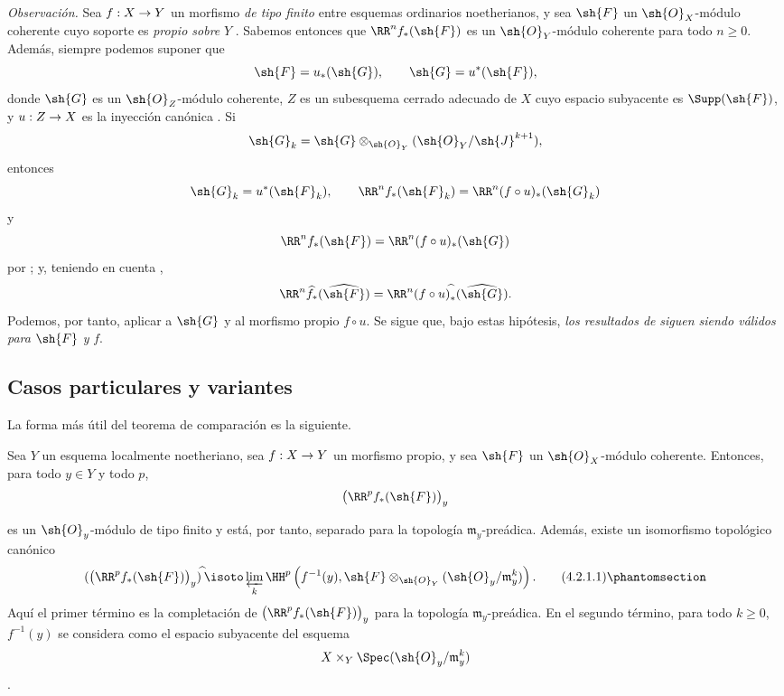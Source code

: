 \documentclass[oneside]{amsart}
\makeatletter
\renewcommand{\geq}{\geqslant}
\newcommand{\ega@arrow}[2]{\mathchoice{#1}{#2}{#2}{#2}}
\renewcommand{\to}{\ega@arrow{\longrightarrow}{\rightarrow}}
\newcommand{\oldpage}[2][]{{\marginnote{\normalfont\textbf{#1}~|~#2}}\ignorespaces}
\let\EGAOriginalLabel\label
\renewcommand{\label}[1]{\phantomsection\EGAOriginalLabel{#1}}
\makeatother
\begin{document}
\begin{env}[4.1.10]
\label{III.4.1.10}
\emph{Observación.}
Sea $f:X\to Y$ un morfismo \emph{de tipo finito} entre esquemas ordinarios
noetherianos, y sea $\sh{F}$ un $\sh{O}_X$-módulo coherente cuyo
soporte es \emph{propio sobre} $Y$ .
Sabemos entonces  que $\RR^n f_*(\sh{F})$ es un
$\sh{O}_Y$-módulo coherente para todo $n\geq0$.
Además, siempre podemos suponer que
\[
  \sh{F}=u_*(\sh{G}),
  \qquad
  \sh{G}=u^*(\sh{F}),
\]
donde $\sh{G}$ es un $\sh{O}_Z$-módulo coherente, $Z$ es un
subesquema cerrado adecuado de $X$ cuyo espacio subyacente es
$\Supp(\sh{F})$, y $u:Z\to X$ es la inyección canónica
.
Si
\[
  \sh{G}_k
  =
  \sh{G}\otimes_{\sh{O}_Y}
  (\sh{O}_Y/\sh{J}^{k+1}),
\]
entonces
\[
  \sh{G}_k=u^*(\sh{F}_k),
  \qquad
  \RR^n f_*(\sh{F}_k)
  =
  \RR^n(f\circ u)_*(\sh{G}_k)
\]
y
\[
  \RR^n f_*(\sh{F})
  =
  \RR^n(f\circ u)_*(\sh{G})
\]
por ; y, teniendo en cuenta ,
\[
  \RR^n\widehat{f}_*(\widehat{\sh{F}})
  =
  \RR^n(f\circ u)^{\widehat{\,}}_*(\widehat{\sh{G}}).
\]
Podemos, por tanto, aplicar  a $\sh{G}$ y al morfismo
propio $f\circ u$.
Se sigue que, bajo estas hipótesis, \emph{los resultados de}
 \emph{siguen siendo válidos para} $\sh{F}$ \emph{y} $f$.
\end{env}


\subsection{Casos particulares y variantes}
\label{subsection:III.4.2}

La forma más útil del teorema de comparación  es la
siguiente.

\begin{proposition}[4.2.1]
\label{III.4.2.1}
Sea $Y$ un esquema localmente noetheriano, sea $f:X\to Y$ un
morfismo propio, y sea $\sh{F}$ un $\sh{O}_X$-módulo coherente.
Entonces, para todo $y\in Y$ y todo $p$,
\[
  \bigl(\RR^p f_*(\sh{F})\bigr)_y
\]

\oldpage[III]{130}

es un $\sh{O}_y$-módulo de tipo finito y está, por tanto, separado
para la topología $\mathfrak{m}_y$-preádica.
Además, existe un isomorfismo topológico canónico
\[
  (\bigl(\RR^p f_*(\sh{F})\bigr)_y)^{\widehat{\,}}
  \isoto
  \varprojlim_k
  \HH^p\left(
    f^{-1}(y),
    \sh{F}\otimes_{\sh{O}_Y}
    (\sh{O}_y/\mathfrak{m}_y^k)
  \right).
  \tag{4.2.1.1}
  \label{III.4.2.1.1}
\]
Aquí el primer término es la completación de
$\bigl(\RR^p f_*(\sh{F})\bigr)_y$ para la topología
$\mathfrak{m}_y$-preádica.
En el segundo término, para todo $k\geq0$, $f^{-1}(y)$ se considera
como el espacio subyacente del esquema
\[
  X\times_Y\Spec(\sh{O}_y/\mathfrak{m}_y^k)
\]
\textup{}.
\end{proposition}
\end{document}
